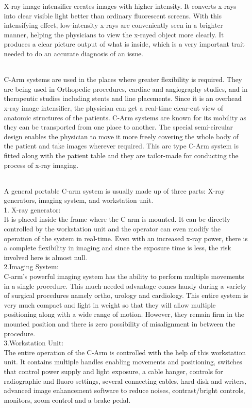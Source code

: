 \documentclass[12pt]{article}
\begin{document}
\indent

X-ray image intensifier creates images with higher intensity. It converts x-rays into clear visible light better than ordinary fluorescent screens. With this intensifying effect, low-intensity x-rays are conveniently seen in a brighter manner, helping the physicians to view the x-rayed object more clearly. It produces a clear picture output of what is inside, which is a very important trait needed to do an accurate diagnosis of an issue.

\\
C-Arm systems are used in the places where greater flexibility is required. They are being used in Orthopedic procedures, cardiac and angiography studies, and in therapeutic studies including stents and line placements. Since it is an overhead x-ray image intensifier, the physician can get a real-time clear-cut view of anatomic structures of the patients. C-Arm systems are known for its mobility as they can be transported from one place to another. The special semi-circular design enables the physician to move it more freely covering the whole body of the patient and take images wherever required. This arc type C-Arm system is fitted along with the patient table and they are tailor-made for conducting the process of x-ray imaging.

\\
A general portable C-arm system is usually made up of three parts: X-ray generators, imaging system, and workstation unit.
\\
1. X-ray generator:
\\
It is placed inside the frame where the C-arm is mounted. It can be directly controlled by the workstation unit and the operator can even modify the operation of the system in real-time. Even with an increased x-ray power, there is a complete flexibility in imaging and since the exposure time is less, the risk involved here is almost null.
\\
2.Imaging System:
\\
C-arm’s powerful imaging system has the ability to perform multiple movements in a single procedure. This much-needed advantage comes handy during a variety of surgical procedures namely ortho, urology and cardiology. This entire system is very much compact and light in weight so that they will allow multiple positioning along with a wide range of motion. However, they remain firm in the mounted position and there is zero possibility of misalignment in between the procedure.
\\
3.Workstation Unit:
\\
The entire operation of the C-Arm is controlled with the help of this workstation unit. It contains multiple handles enabling movements and positioning, switches that control power supply and light exposure, a cable hanger, controls for radiographic and fluoro settings, several connecting
cables, hard disk and writers, advanced image enhancement software to reduce noises, contrast/bright controls, monitors, zoom control and a brake pedal.
\end{document}
